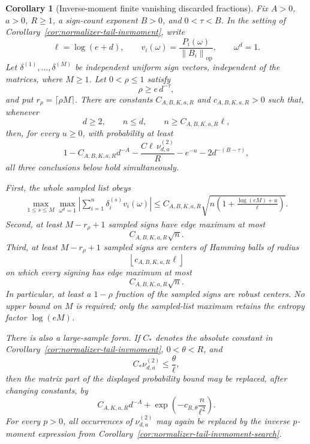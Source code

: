 \documentclass[11pt]{amsart}
\numberwithin{equation}{section}
\newtheorem{corollary}[theorem]{Corollary}
\theoremstyle{definition}
\theoremstyle{remark}
\newcommand{\op}{\mathrm{op}}
\newcommand{\norm}[1]{\left\lVert #1\right\rVert}
\begin{document}
\begin{corollary}[Inverse-moment finite vanishing discarded fractions]
\label{cor:normalizer-tail-invmoment-vanishing-fractions}
Fix \(A>0\), \(a>0\), \(R\ge1\), a sign-count exponent \(B>0\), and
\(0<\tau<B\).  In the setting of
Corollary~\ref{cor:normalizer-tail-invmoment}, write
\[
  \ell=\log(e+d),\qquad
  v_i(\omega)=\frac{P_i(\omega)}{\norm{B_i}_{\op}},
  \qquad \omega^d=1 .
\]
Let \(\delta^{(1)},\ldots,\delta^{(M)}\) be independent uniform sign vectors,
independent of the matrices, where \(M\ge1\).  Let \(0<\rho\le1\) satisfy
\[
  \rho\ge e\,d^{-\tau},
\]
and put \(r_\rho=\lceil\rho M\rceil\).  There are constants
\(C_{A,B,K,a,R}\) and \(c_{A,B,K,a,R}>0\) such that, whenever
\[
  d\ge2,\qquad n\le d,\qquad n\ge C_{A,B,K,a,R}\ell ,
\]
then, for every \(u\ge0\), with probability at least
\[
  1-C_{A,B,K,a,R}d^{-A}
  -\frac{C\ell\,\nu_{d,a}^{(2)}}{R}
  -e^{-u}-2d^{-(B-\tau)},
\]
all three conclusions below hold simultaneously.

First, the whole sampled list obeys
\[
\begin{aligned}
  \max_{1\le s\le M}\max_{\omega^d=1}
  \left|\sum_{i=1}^n\delta_i^{(s)}v_i(\omega)\right|
  \le
  C_{A,B,K,a,R}
  \sqrt{n\left(1+\frac{\log(eM)+u}{\ell}\right)} .
\end{aligned}
\]
Second, at least \(M-r_\rho+1\) sampled signs have edge maximum at most
\[
  C_{A,B,K,a,R}\sqrt n .
\]
Third, at least \(M-r_\rho+1\) sampled signs are centers of Hamming balls of
radius
\[
  \left\lfloor c_{A,B,K,a,R}\ell\right\rfloor
\]
on which every signing has edge maximum at most
\[
  C_{A,B,K,a,R}\sqrt n .
\]
In particular, at least a \(1-\rho\) fraction of the sampled signs are robust
centers.  No upper bound on \(M\) is required; only the sampled-list maximum
retains the entropy factor \(\log(eM)\).

There is also a large-sample form.  If \(C_*\) denotes the absolute constant in
Corollary~\ref{cor:normalizer-tail-invmoment}, \(0<\theta<R\), and
\[
  C_*\nu_{d,a}^{(2)}\le\frac{\theta}{\ell},
\]
then the matrix part of the displayed probability bound may be replaced, after
changing constants, by
\[
  C_{A,K,a,R}d^{-A}
  +\exp\left(-c_{R,\theta}\frac n{\ell^2}\right).
\]
For every \(p>0\), all occurrences of \(\nu_{d,a}^{(2)}\) may again be replaced
by the inverse \(p\)-moment expression from
Corollary~\ref{cor:normalizer-tail-invmoment-search}.
\end{corollary}
\end{document}
